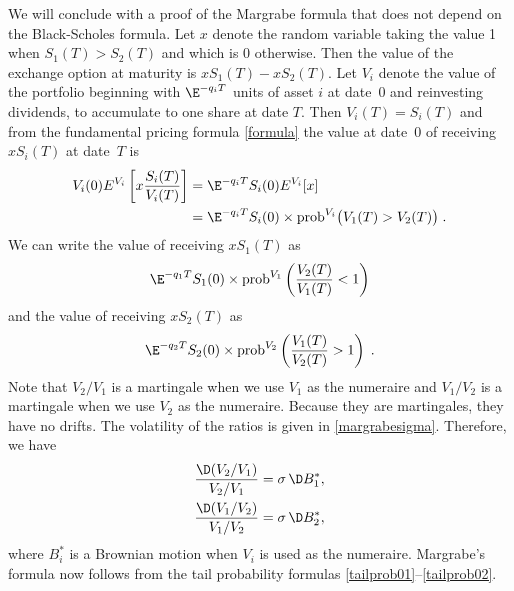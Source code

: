 \begin{petit}
We will conclude with a  proof of the Margrabe formula that does not depend on the Black-Scholes formula.   Let $x$ denote the random variable taking the value 1 when $S_1(T)>S_2(T)$ and which is 0 otherwise.  Then the value of the exchange option at maturity is $xS_1(T)-xS_2(T)$.  Let $V_i$ denote the value of the portfolio beginning with $\E^{-q_iT}$ units of asset $i$ at date~0 and reinvesting dividends, to accumulate to one share at date $T$.  Then $V_i(T)=S_i(T)$ and from the fundamental pricing formula \eqref{formula} the value at date~0 of receiving $xS_i(T)$ at date~$T$ is
\begin{align*}
V_i(0)E^{V_i}\left[x\frac{S_i(T)}{V_i(T)}\right] &= \E^{-q_iT}S_i(0)E^{V_i}[x] \\
&= \E^{-q_iT}S_i(0)\times\text{prob}^{V_i}\big(V_1(T)>V_2(T)\big)\; .
\end{align*}
We can write the value of receiving $xS_1(T)$ as
$$\E^{-q_1T}S_1(0)\times\text{prob}^{V_1}\left(\frac{V_2(T)}{V_1(T)} < 1\right)$$
and the value of receiving $xS_2(T)$ as
$$\E^{-q_2T}S_2(0)\times\text{prob}^{V_2}\left(\frac{V_1(T)}{V_2(T)} > 1\right)\;.$$
Note that $V_2/V_1$ is a martingale when we use $V_1$ as the numeraire and $V_1/V_2$ is a martingale when we use $V_2$ as the numeraire.  Because they are martingales, they have no drifts.  The volatility of the ratios is given in \eqref{margrabesigma}.  Therefore, we have
\begin{align*}
\frac{\D (V_2/V_1)}{V_2/V_1} &= \sigma \,\D B^*_1,\\
\frac{\D (V_1/V_2)}{V_1/V_2} &= \sigma \,\D B^*_2,
\end{align*}
where $B^*_i$ is a Brownian motion when $V_i$ is used as the numeraire.  Margrabe's formula now follows from the tail probability formulas \eqref{tailprob01}--\eqref{tailprob02}.  
\end{petit}

